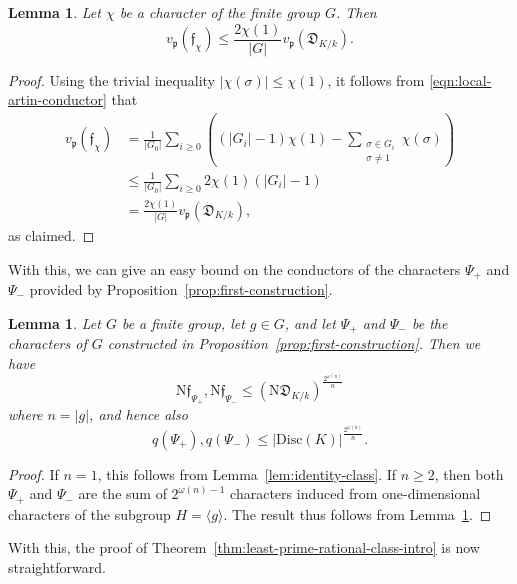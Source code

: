 \documentclass[12pt]{amsart}
\newtheorem{lemma}[theorem]{Lemma}
\theoremstyle{definition} \newtheorem{definition}[theorem]{Definition}
\theoremstyle{example} \newtheorem{example}[theorem]{Example}
\theoremstyle{remark} \newtheorem{remark}{Remark}[theorem]
\numberwithin{equation}{section}
\numberwithin{theorem}{section}
\renewcommand{\leq}{\leqslant}
\renewcommand{\geq}{\geqslant}
\newcommand{\N}{\mathrm{N}} %
\begin{document}
	
	\begin{lemma} \label{lem:conductor-vs-degree}
		Let $\chi$ be a character of the finite group $G$.  Then
			\[
				v_\mathfrak{p}(\mathfrak{f}_\chi)
					\leq \frac{ 2 \chi(1)}{|G|} v_\mathfrak{p}(\mathfrak{D}_{K/k}).
			\]
	\end{lemma}
	\begin{proof}
		Using the trivial inequality $|\chi(\sigma)| \leq \chi(1)$, it follows from \eqref{eqn:local-artin-conductor} that
			\begin{align*}
				v_\mathfrak{p}(\mathfrak{f}_\chi)
					&= \frac{1}{|G_0|}\sum_{i \geq 0} \left( (|G_i|-1)\chi(1) - \sum_{\substack{ \sigma \in G_i \\ \sigma \ne 1}} \chi(\sigma)\right) \\
					&\leq \frac{1}{|G_0|}\sum_{i \geq 0} 2\chi(1)(|G_i|-1) \\
					&= \frac{2 \chi(1)}{|G|} v_\mathfrak{p}(\mathfrak{D}_{K/k}),
			\end{align*}
		as claimed.
	\end{proof}
	
	With this, we can give an easy bound on the conductors of the characters $\Psi_+$ and $\Psi_-$ provided by Proposition~\ref{prop:first-construction}.
	
	\begin{lemma} \label{lem:unconditional-conductors}
		Let $G$ be a finite group, let $g \in G$, and let $\Psi_+$ and $\Psi_-$ be the characters of $G$ constructed in Proposition~\ref{prop:first-construction}.  Then we have 
			\[
				\N\mathfrak{f}_{\Psi_+}, \N\mathfrak{f}_{\Psi_-}
					\leq (\N\mathfrak{D}_{K/k})^{\frac{2^{\omega(n)}}{n}}
			\]
		where $n = |g|$, and hence also
			\[
				q(\Psi_+),q(\Psi_-)
					\leq |\mathrm{Disc}(K)|^{\frac{2^{\omega(n)}}{n}}.
			\]
	\end{lemma}
	\begin{proof}
		If $n=1$, this follows from Lemma~\ref{lem:identity-class}.  If $n \geq 2$, then both $\Psi_+$ and $\Psi_-$ are the sum of $2^{\omega(n)-1}$ characters induced from one-dimensional characters of the subgroup $H = \langle g \rangle$.  The result thus follows from Lemma~\ref{lem:conductor-vs-degree}.
	\end{proof}
	
	With this, the proof of Theorem~\ref{thm:least-prime-rational-class-intro} is now straightforward.
	
\end{document}
